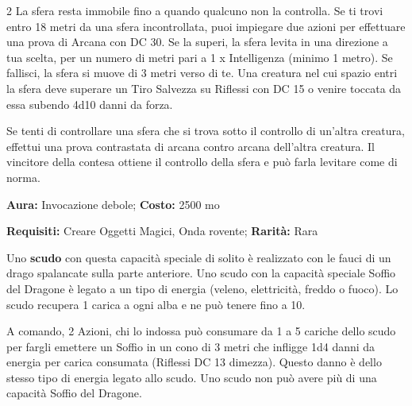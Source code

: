 \begin{multicols}{2}
La sfera resta immobile fino a quando qualcuno non la controlla. Se ti trovi entro 18 metri da una sfera incontrollata, puoi impiegare due azioni per effettuare una prova di Arcana con DC 30. Se la superi, la sfera levita in una direzione a tua scelta, per un numero di metri pari a 1 x Intelligenza (minimo 1 metro). Se fallisci, la sfera si muove di 3 metri verso di te. Una creatura nel cui spazio entri la sfera deve superare un Tiro Salvezza su Riflessi con DC 15 o venire toccata da essa subendo 4d10 danni da forza.

Se tenti di controllare una sfera che si trova sotto il controllo di un'altra creatura, effettui una prova contrastata di arcana contro arcana dell'altra creatura. Il vincitore della contesa ottiene il controllo della sfera e può farla levitare come di norma.



%



\textbf{Aura:} Invocazione debole; \textbf{Costo:} 2500 mo

\textbf{Requisiti:} Creare Oggetti Magici, Onda rovente; \textbf{Rarità:} Rara

Uno \textbf{scudo} con questa capacità speciale di solito è realizzato con le fauci di un drago spalancate sulla parte anteriore. Uno scudo con la capacità speciale Soffio del Dragone è legato a un tipo di energia (veleno, elettricità, freddo o fuoco). Lo scudo recupera 1 carica a ogni alba e ne può tenere fino a 10.

A comando, 2 Azioni, chi lo indossa può consumare da 1 a 5 cariche dello scudo per fargli emettere un Soffio in un cono di 3 metri che infligge 1d4 danni da energia per carica consumata (Riflessi DC 13 dimezza). Questo danno è dello stesso tipo di energia legato allo scudo. Uno scudo non può avere più di una capacità Soffio del Dragone.


\end{multicols}
